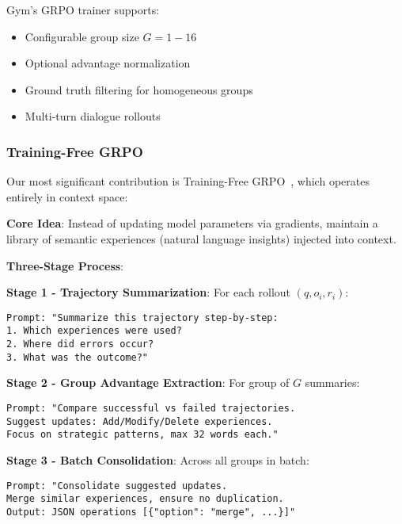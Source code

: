 \documentclass[11pt,letterpaper]{article}
\begin{document}
Gym's GRPO trainer supports:
\begin{itemize}
\item Configurable group size $G = 1-16$
\item Optional advantage normalization
\item Ground truth filtering for homogeneous groups
\item Multi-turn dialogue rollouts
\end{itemize}

\subsubsection{Training-Free GRPO}

Our most significant contribution is Training-Free GRPO~\citep{tencent2025trainingfree}, which operates entirely in context space:

\textbf{Core Idea}: Instead of updating model parameters via gradients, maintain a library of semantic experiences (natural language insights) injected into context.

\textbf{Three-Stage Process}:

\textbf{Stage 1 - Trajectory Summarization}: For each rollout $(q, o_i, r_i)$:
\begin{verbatim}
Prompt: "Summarize this trajectory step-by-step:
1. Which experiences were used?
2. Where did errors occur?
3. What was the outcome?"
\end{verbatim}

\textbf{Stage 2 - Group Advantage Extraction}: For group of $G$ summaries:
\begin{verbatim}
Prompt: "Compare successful vs failed trajectories.
Suggest updates: Add/Modify/Delete experiences.
Focus on strategic patterns, max 32 words each."
\end{verbatim}

\textbf{Stage 3 - Batch Consolidation}: Across all groups in batch:
\begin{verbatim}
Prompt: "Consolidate suggested updates.
Merge similar experiences, ensure no duplication.
Output: JSON operations [{"option": "merge", ...}]"
\end{verbatim}
\end{document}
